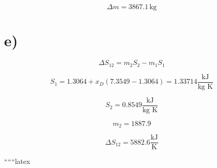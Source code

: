 \[
\Delta m = 3867.1 \, \text{kg}
\]

\section*{e)}

\[
\Delta S_{12} = m_2 S_2 - m_1 S_1
\]

\[
S_1 = 1.3064 + x_D (7.3549 - 1.3064) = 1.33714 \frac{\text{kJ}}{\text{kg K}}
\]

\[
S_2 = 0.8549 \frac{\text{kJ}}{\text{kg K}}
\]

\[
m_2 = 1887.9
\]

\[
\Delta S_{12} = 5882.6 \frac{\text{kJ}}{\text{K}}
\]

``````latex



